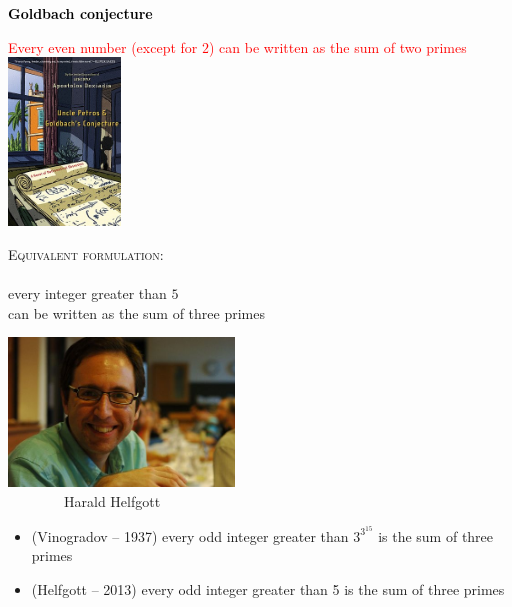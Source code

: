 \documentclass[landscape,display]{powersem} %
\newcommand{\heading}[1]{%
 \begin{center}
  \large\bf
  \shadowbox{{\textcolor{conceptcolor}{#1}}}%
 \end{center}
 \vspace{1ex minus 1ex}}
\begin{document}
\begin{slide}
\heading{The five conjectures today -- any News?}\pause

\textcolor{blue}{}\textcolor{black}{\textbf{Goldbach conjecture}} 

\textcolor{red}{Every even number (except for $2$) can be written as the sum of two primes}\pause
 \includegraphics[width=3cm]{images/petros_en.jpg}\pause
\vspace{-2cm}\hspace*{4cm}
\begin{minipage}{7cm}
\textsc{Equivalent formulation:}\\
\\
every integer greater than $5$ \\
can be written as the sum of three primes\end{minipage}

\end{slide}

\begin{slide}
 \heading{From Vinogradov to Helfgott}

 \includegraphics[width=6cm]{images/helfgott.jpg}\\ \ \ \ \ \ \ \ \ Harald Helfgott\pause
\vspace{-4cm}\hspace*{6cm}
\begin{minipage}{5cm}
\begin{itemize}
 \item (Vinogradov -- 1937) every odd integer greater than  $3^{3^{15}}$  is the sum of three primes
 \item (Helfgott -- 2013) every odd integer greater than 5 is the sum of three primes
\end{itemize}
\end{minipage}
\end{slide}
\end{document}
